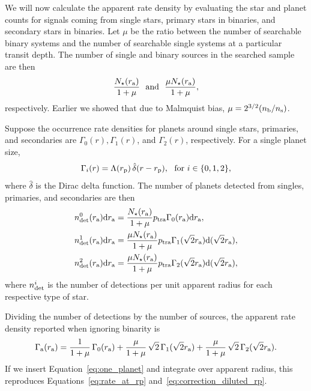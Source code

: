 \documentclass[12pt,modern]{aastex61}
\renewcommand{\a}{_{\rm a}}
\newcommand{\s}{_{\rm s}}
\newcommand{\p}{_{\rm p}}
\renewcommand{\b}{_{\rm b}}
\begin{document}
We will now calculate the apparent rate density by evaluating the star
and planet counts for signals coming from single stars, primary stars
in binaries, and secondary stars in binaries.  Let $\mu$ be the ratio
between the number of searchable binary systems and the number of
searchable single systems at a particular transit depth. The number of
single and binary sources in the searched sample are then
\begin{equation}
  \frac{N_\star(r\a)}{1+\mu}~~{\rm and}~~\frac{\mu N_\star(r\a)}{1+\mu},
  \label{eq:N_searched}
\end{equation}
respectively.  Earlier we showed that due to Malmquist bias, $\mu =
2^{3/2}(n\b/n\s)$.

Suppose the occurrence rate densities for planets around
single stars, primaries, and secondaries are $\Gamma_0(r),
\Gamma_1(r)$, and $\Gamma_2(r)$, respectively. For a single planet
size,
\begin{equation}
    \Gamma_i(r) = \Lambda(r\p) \, \hat{\delta}(r-r\p),~~{\rm for}
    \ i\in\{0,1,2\},
    \label{eq:one_planet}
\end{equation} 
where $\hat{\delta}$ is the Dirac delta function.
The number of planets detected from singles, primaries, and
secondaries are then
\begin{align}
  n_{\rm det}^0(r\a)\mathrm{d}r\a &= 
      \frac{N_\star(r\a)}{1+\mu} p_{\rm tra}
      \Gamma_0(r\a)\mathrm{d}r\a,
  \label{eq:n0} \\
  n_{\rm det}^1(r\a)\mathrm{d}r\a &= 
      \frac{\mu N_\star(r\a)}{1+\mu} p_{\rm tra}
      \Gamma_1(\sqrt{2}r\a)\mathrm{d}(\sqrt{2}r\a),
	\label{eq:n1} \\
  n_{\rm det}^2(r\a)\mathrm{d}r\a &=
      \frac{\mu N_\star(r\a)}{1+\mu} p_{\rm tra}
      \Gamma_2(\sqrt{2}r\a)\mathrm{d}(\sqrt{2}r\a),
	\label{eq:n2}
\end{align}
where $n_{\rm det}^i$ is the number of detections per unit apparent
radius for each respective type of star.

Dividing the number of detections by the number of sources,
the apparent rate density reported when ignoring binarity is
\begin{equation}
  \Gamma\a(r\a) =
    \frac{1}{1+\mu}\,\Gamma_0(r\a) +
    \frac{\mu}{1+\mu}\,\sqrt{2}\,\Gamma_1(\sqrt{2}r\a) +
    \frac{\mu}{1+\mu}\,\sqrt{2}\,\Gamma_2(\sqrt{2}r\a).
	\label{eq:formula_twin_binary}
\end{equation}
If we insert Equation~\ref{eq:one_planet} and integrate over
apparent radius, this reproduces Equations~\ref{eq:rate_at_rp}
and~\ref{eq:correction_diluted_rp}.
\end{document}
